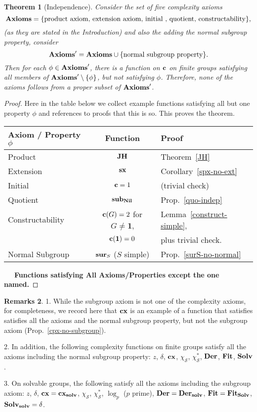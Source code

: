 \documentclass[a4paper,11pt]{amsart}
\newtheorem{theorem}{Theorem}[section]
\theoremstyle{definition}
\newtheorem{remarks}[theorem]{Remarks}
\newcommand{\cx}{\mbox{\bf cx}}
\renewcommand{\c}{\mbox{\bf c}}
\newcommand{\sx}{{\bf sx}}
\newcommand{\Ax}{{\bf Axioms}}
\newcommand{\Fit}{{\bf Fit}}
\newcommand{\Der}{{\bf Der}}
\newcommand{\Solv}{{\bf Solv}}
\newcommand{\Nil}{{\bf Nil}}
\newcommand{\solv}{{\bf solv}}
\newcommand{\JH}{{\bf JH}}
\newcommand{\1}{{\mathbf 1}}
\renewcommand{\S}{{\mathscr{S}}}
\newcommand{\surS}{{\bf sur}}
\newcommand{\subS}{{\bf sub}}
\begin{document}
\begin{theorem}[Independence] Consider the set of five complexity axioms  $$\Ax= \{ \mbox{\rm product axiom, extension axiom, initial , quotient, constructability}\},$$  (as they are stated in the Introduction)  and also the 
adding the normal subgroup property, consider $$\Ax'= \Ax \cup \{ \mbox{\rm normal subgroup property}\}.$$
Then for each $\phi \in \Ax'$, there is a function on $\c$ on finite groups satisfying all members of $\Ax'\setminus \{\phi\}$, but not satisfying $\phi$.
Therefore, none of the axioms follows from a proper subset of $\Ax'$. 
\end{theorem}
\begin{proof}


Here in the table below we collect example functions satisfying all but one property $\phi$ and references to proofs that this is so.
This proves the theorem.

\begin{tabular}{|l|c|l|}
\hline
Axiom / Property $\phi$ & Function & Proof \\
\hline
\hline
Product & $\JH$ & Theorem~\ref{JH}\\
\hline
Extension & $\sx$ & Corollary~\ref{spx-no-ext} \\
\hline
Initial & $\c=1$ & (trivial check)\\
\hline
Quotient &$\subS_\Nil$ & Prop.~\ref{quo-indep}\\
\hline
Constructability &$\c(G)=2$ for $G\neq\1$, &  Lemma~\ref{construct-simple}, \\
 & $\c(\1)=0$ & plus trivial check.\\
\hline
Normal Subgroup &  $\surS_S$ ($S$ simple) & Prop.~\ref{surS-no-normal}\\
\hline
\end{tabular}

\noindent \ \ \ {\bf Functions satisfying All Axioms/Properties except the one named.}

\end{proof}
\begin{remarks}


1. While the subgroup axiom is not one of the complexity axioms,
for completeness, we record here that $\cx$ is an example of a function that
satisfies satisfies all
the axioms and the normal subgroup property, but not the subgroup axiom (Prop.~\ref{cpx-no-subgroup}).

2. In addition, the following complexity functions on finite groups satisfy all the axioms including the normal subgroup property: $z$, $\delta$, $\cx$, $\chi_{\S}$, $\chi^*_{\S}$, $\Der$, $\Fit$, $\Solv$.

3. On solvable groups, the following satisfy all the axioms including the subgroup axiom:
$z$, $\delta$, $\cx=\cx_\solv$, $\chi_{\S}$,  $\chi^*_{\S}$, $\log_p$ ($p$ prime),  $\Der=\Der_\solv$, $\Fit=\Fit_\Solv$, $\Solv_\solv=\delta$.
\end{remarks}









\end{document}
